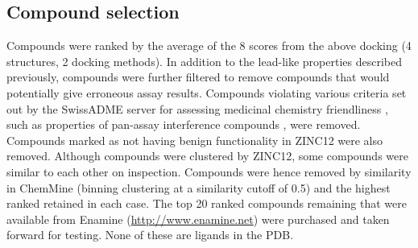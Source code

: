 \subsection{Compound selection}

Compounds were ranked by the average of the 8 scores from the above docking (4 structures, 2 docking methods).
In addition to the lead-like properties described previously, compounds were further filtered to remove compounds that would potentially give erroneous assay results.
Compounds violating various criteria set out by the SwissADME server for assessing medicinal chemistry friendliness \cite{Daina2017}, such as properties of pan-assay interference compounds \cite{Baell2014}, were removed.
Compounds marked as not having benign functionality in ZINC12 were also removed.
Although compounds were clustered by ZINC12, some compounds were similar to each other on inspection.
Compounds were hence removed by similarity in ChemMine \cite{Backman2011} (binning clustering at a similarity cutoff of 0.5) and the highest ranked retained in each case.
The top 20 ranked compounds remaining that were available from Enamine (\url{http://www.enamine.net}) were purchased and taken forward for testing.
None of these are ligands in the PDB.


